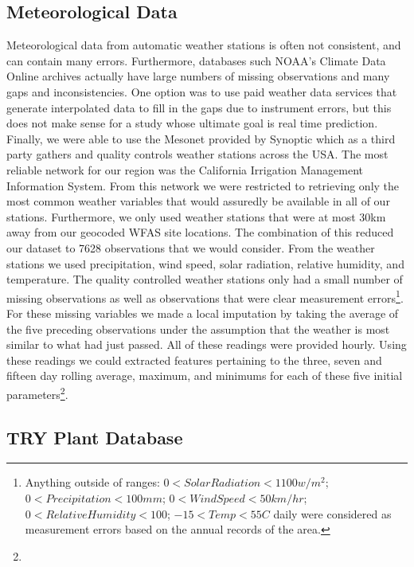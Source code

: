 \documentclass[twocolumn,10pt]{article}
\begin{document}
\subsection{Meteorological Data}
Meteorological data from automatic weather stations is often not consistent, and can contain many errors. Furthermore, databases such NOAA's Climate Data Online archives actually have large numbers of missing observations and many gaps and inconsistencies. One option was to use paid weather data services that generate interpolated data to fill in the gaps due to instrument errors, but this does not make sense for a study whose ultimate goal is real time prediction. Finally, we were able to use the Mesonet provided by Synoptic which as a third party gathers and quality controls weather stations across the USA. The most reliable network for our region was the California Irrigation Management Information System. From this network we were restricted to retrieving only the most common weather variables that would assuredly be available in all of our stations. Furthermore, we only used weather stations that were at most 30km away from our geocoded WFAS site locations. The combination of this reduced our dataset to 7628 observations that we would consider. From the weather stations we used precipitation, wind speed, solar radiation, relative humidity, and temperature. The quality controlled weather stations only had a small number of missing observations as well as observations that were clear measurement errors\footnote{Anything outside of ranges: $0< Solar Radiation < 1100w/m^2$; $0 < Precipitation < 100mm$; $0 < Wind Speed < 50km/hr$; $0 < Relative Humidity < 100$; $-15< Temp < 55C$ daily were considered as measurement errors based on the annual records of the area. }. For these missing variables we made a local imputation by taking the average of the five preceding observations under the assumption that the weather is most similar to what had just passed. All of these readings were provided hourly. Using these readings we could extracted features pertaining to the three, seven and fifteen day rolling average, maximum, and minimums for each of these five initial parameters\footnote{}. \\

\subsection{TRY Plant Database}
\end{document}
